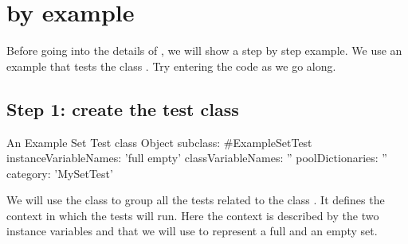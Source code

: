 \documentclass[a4paper,10pt,twoside]{book}
\begin{document}



\section{\sunit by example}

Before going into the details of \SUnit, we will show a step by step
example.  We use an example that tests the class .  Try
entering the code as we go along.
\subsection{Step 1: create the test class}


\begin{classdef}[exampleSetTest]{An Example Set Test class}
Object subclass: #ExampleSetTest
	instanceVariableNames: 'full empty'
	classVariableNames: ''
	poolDictionaries: ''
	category: 'MySetTest'
\end{classdef}


We will use the class  to group all the tests related to
the class .  It defines the context in which the tests
will run.  Here the context is described by
the two instance variables  and 
that we will use to represent a full and an empty set.
\end{document}

